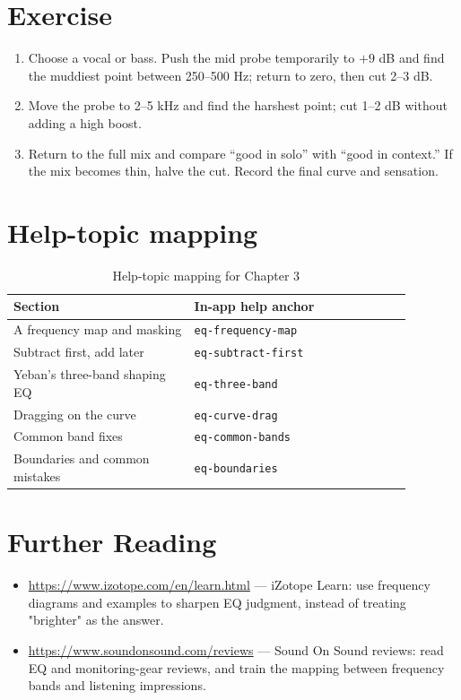 \section{Exercise}


\begin{exercise}
\begin{enumerate}
  \item Choose a vocal or bass. Push the mid probe temporarily to $+9$ dB and find the muddiest point between 250--500 Hz; return to zero, then cut 2--3 dB.
  \item Move the probe to 2--5 kHz and find the harshest point; cut 1--2 dB without adding a high boost.
  \item Return to the full mix and compare ``good in solo'' with ``good in context.'' If the mix becomes thin, halve the cut. Record the final curve and sensation.
\end{enumerate}
\end{exercise}

\section{Help-topic mapping}

\begin{table}[htbp]
\centering
\small
\begin{tabular}{@{}p{0.40\linewidth}p{0.48\linewidth}@{}}
\hline
Section & In-app help anchor \\
\hline
A frequency map and masking & \texttt{eq-frequency-map} \\
Subtract first, add later & \texttt{eq-subtract-first} \\
Yeban's three-band shaping EQ & \texttt{eq-three-band} \\
Dragging on the curve & \texttt{eq-curve-drag} \\
Common band fixes & \texttt{eq-common-bands} \\
Boundaries and common mistakes & \texttt{eq-boundaries} \\
\hline
\end{tabular}
\caption{Help-topic mapping for Chapter 3}
\end{table}

\section*{Further Reading}
\begin{itemize}[leftmargin=1.5em]
\item \url{https://www.izotope.com/en/learn.html} — iZotope Learn: use frequency diagrams and examples to sharpen EQ judgment, instead of treating "brighter" as the answer.
\item \url{https://www.soundonsound.com/reviews} — Sound On Sound reviews: read EQ and monitoring-gear reviews, and train the mapping between frequency bands and listening impressions.
\end{itemize}
